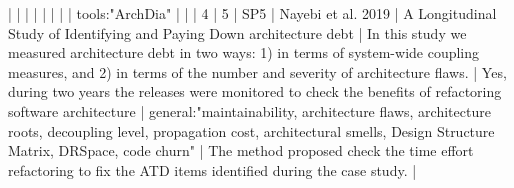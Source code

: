 |    |            |      |                                                                      |                                                                                                                                                                          |                                                                                                                                                                                                                                                            |                                                                                                                                                                                                                                                                      |  tools:"ArchDia"                                                                                                                                                                                                                                                                                         |                                                                                                                                                                                                                                                                                                                                                                                                                                                                                              |
|  4 |          5 | SP5  | Nayebi et al. 2019                                                   | A Longitudinal Study of Identifying and Paying Down architecture debt                                                                                                    | In this study we measured architecture debt in two ways: 1) in terms of system-wide coupling measures, and 2) in terms of the number and severity of architecture flaws.                                                                                 | Yes, during two years the releases were monitored to check the benefits of refactoring software architecture                                                                                                                                                       | general:"maintainability, architecture flaws, architecture roots, decoupling level, propagation cost, architectural smells, Design Structure Matrix, DRSpace, code churn"                                                                                                                                | The method proposed check the time effort refactoring to fix the ATD items identified during the case study.                                                                                                                                                                                                                                                                                                                                                                             |
